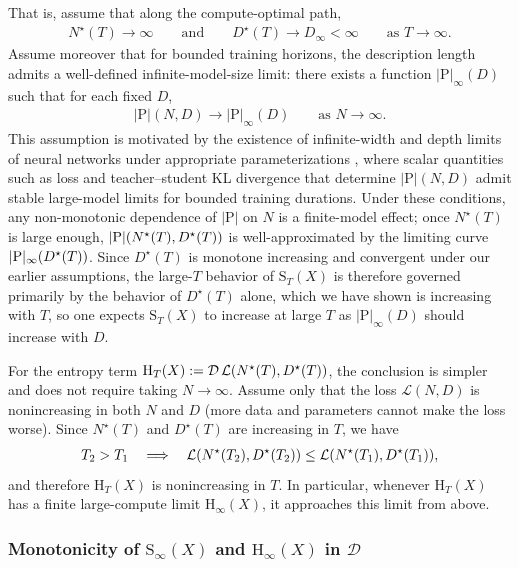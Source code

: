 \documentclass[twoside]{article}
\renewcommand{\L}{\mathcal{L}}
\newcommand{\D}{\mathcal{D}}
\newcommand{\rH}{\mathrm{H}}
\newcommand{\rS}{\mathrm{S}}
\renewcommand{\L}{\mathcal{L}}
\begin{document}
That is, assume that along the compute-optimal path,
\begin{align}
    N^\star(T) \to \infty
    \qquad \text{and} \qquad
    D^\star(T) \to D_\infty < \infty
    \qquad \text{as } T \to \infty.
\end{align}
Assume moreover that for bounded training horizons, the description length admits a well-defined infinite-model-size limit: there exists a function $|\mathrm{P}|_\infty(D)$ such that for each fixed $D$,
\begin{align}
    |\mathrm{P}|(N, D) \to |\mathrm{P}|_\infty(D)
    \qquad \text{as } N \to \infty.
\end{align}
This assumption is motivated by the existence of infinite-width and depth limits of neural networks under appropriate parameterizations \citep{yang2023tensor,dey2025don}, where scalar quantities such as loss and teacher--student KL divergence that determine $|\mathrm{P}|(N, D)$ admit stable large-model limits for bounded training durations. Under these conditions, any non-monotonic dependence of $|\mathrm{P}|$ on $N$ is a finite-model effect; once $N^\star(T)$ is large enough, $|\mathrm{P}|\qty(N^\star(T), D^\star(T))$ is well-approximated by the limiting curve $|\mathrm{P}|_\infty\qty(D^\star(T))$. Since $D^\star(T)$ is monotone increasing and convergent under our earlier assumptions, the large-$T$ behavior of $\rS_T(X)$ is therefore governed primarily by the behavior of $D^\star(T)$ alone, which we have shown is increasing with $T$, so one expects $\rS_T(X)$ to increase at large $T$ as $|\mathrm{P}|_\infty(D)$ should increase with $D.$

For the entropy term $\rH_T(X) := \D\, \L\qty(N^\star(T), D^\star(T))$, the conclusion is simpler and does not require taking $N \to \infty$. Assume only that the loss $\L(N, D)$ is nonincreasing in both $N$ and $D$ (more data and parameters cannot make the loss worse). Since $N^\star(T)$ and $D^\star(T)$ are increasing in $T$, we have
\begin{align}
    T_2 > T_1
    \quad \Longrightarrow \quad
    \L\qty(N^\star(T_2), D^\star(T_2))
    \le
    \L\qty(N^\star(T_1), D^\star(T_1)),
\end{align}
and therefore $\rH_T(X)$ is nonincreasing in $T$. In particular, whenever $\rH_T(X)$ has a finite large-compute limit $\rH_\infty(X)$, it approaches this limit from above.


\subsubsection{Monotonicity of $\rS_\infty(X)$ and $\rH_\infty(X)$ in $\D$}
\label{app:monotonicity-in-D}
\end{document}
